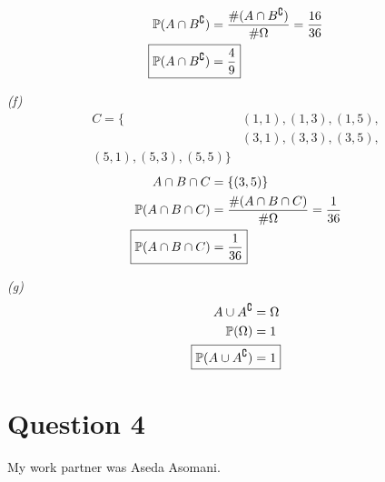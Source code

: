 \documentclass[titlepage, 12pt, leqno]{article}
\begin{document}
\begin{align*}
    \mathbb{P}(A \cap B^\complement) &= \frac{\#(A \cap B^\complement)}{\#\Omega} = \frac{16}{36}  \\
    \Aboxed{\mathbb{P}(A \cap B^\complement) &= \frac{4}{9}}
\end{align*}

\textit{(f)} 
\begin{align*}
    C = \{&(1,1), (1,3), (1,5), \\
          &(3,1), (3,3), (3,5), \\
          (5,1), (5,3), (5,5)\}
\end{align*}
\begin{align*}
    A \cap B \cap C &= \{(3,5)\} \\
    \mathbb{P}(A \cap B \cap C) &= \frac{\#(A \cap B \cap C)}{\#\Omega} = \frac{1}{36} \\
    \Aboxed{\mathbb{P}(A \cap B \cap C) &= \frac{1}{36}}
\end{align*}
\pagebreak

\textit{(g)} 
\begin{align*}
    A \cup A^\complement &= \Omega \\
    \mathbb{P}(\Omega) &= 1 \\
    \Aboxed{\mathbb{P}(A \cup A^\complement) &= 1}
\end{align*}
\pagebreak

\section{Question 4}
My work partner was Aseda Asomani.
\end{document}
